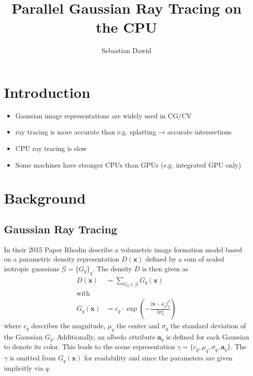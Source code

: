 \documentclass[a4paper, 11pt]{memoir}
\title{Parallel Gaussian Ray Tracing on the CPU}
\author{Sebastian Dawid}
\begin{document}
    \frontmatter
    \smarttitle
    \newpage
    \tableofcontents*

    \clearpage
    \thispagestyle{abs}
    \abstractintoc
    \begin{abstract}
        \lipsum[1]
    \end{abstract}

    \mainmatter
    \chapter{Introduction}
    \begin{itemize}
        \item Gaussian image representations are widely used in CG/CV
        \item ray tracing is more accurate than e.g. splatting →  accurate intersections
        \item CPU ray tracing is slow
        \item Some machines have stronger CPUs than GPUs (e.g. integrated GPU only)
    \end{itemize}

    \chapter{Background}
    \label{ch:background}
    \section{Gaussian Ray Tracing}
    \label{sec:int_grt}
    In their 2015 Paper  \cite{Rhodin:2015} Rhodin \etal describe a volumetric image formation
    model based on a parametric density representation $D(\mathbf{x})$ defined by a sum of scaled isotropic guassians
    $\mathcal{G} = \{ G_q \}_q$. The density $D$ is then given as
    \begin{align}
        D(\mathbf{x}) &= \sum_{G_q \in \mathcal{G}} G_q(\mathbf{x})
        \label{eq:density}\\
        \text{with} \nonumber\\
        G_q(\mathbf{x}) &= c_q \cdot \exp{\left( - \frac{\Vert\mathbf{x} - \mu_q\Vert_2^2}{2\sigma_q^2} \right)}
        \label{eq:gaussian}
    \end{align}
    where $c_q$ describes the magnitude, $\mu_q$ the center and $\sigma_q$ the standard deviation of the Gaussian $G_q$.
    Additionally, an \gls{albedo} attribute $\mathbf{a}_q$ is defined for each Gaussian to denote its color. This leads
    to the scene representation $\gamma = \{ c_q, \mu_q, \sigma_q, \mathbf{a}_q \}$. The $\gamma$ is omitted from
    $G_q(\mathbf{x})$ for readability and since the parameters are given implicitly via $q$.
\end{document}
